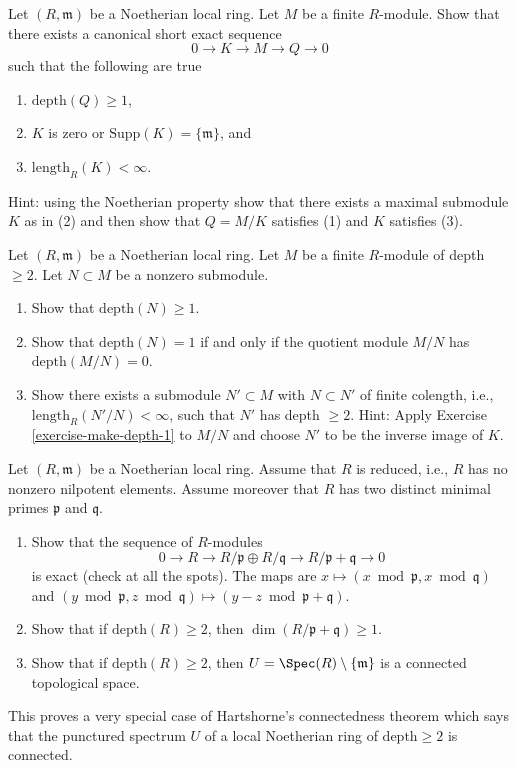 \begin{exercise}
\label{exercise-make-depth-1}
Let $(R, \mathfrak m)$ be a Noetherian local ring.
Let $M$ be a finite $R$-module.
Show that there exists a canonical short exact sequence
$$
0 \to K \to M \to Q \to 0
$$
such that the following are true
\begin{enumerate}
\item $\text{depth}(Q) \geq 1$,
\item $K$ is zero or $\text{Supp}(K) = \{\mathfrak m\}$, and
\item $\text{length}_R(K) < \infty$.
\end{enumerate}
Hint: using the Noetherian property show that
there exists a maximal submodule $K$ as in (2)
and then show that $Q = M/K$ satisfies (1) and $K$ satisfies (3).
\end{exercise}

\begin{exercise}
\label{exercise-make-depth-2}
Let $(R, \mathfrak m)$ be a Noetherian local ring.
Let $M$ be a finite $R$-module of depth $\geq 2$.
Let $N \subset M$ be a nonzero submodule.
\begin{enumerate}
\item Show that $\text{depth}(N) \geq 1$.
\item Show that $\text{depth}(N) = 1$ if and only if the
quotient module $M/N$ has $\text{depth}(M/N) = 0$.
\item Show there exists a submodule $N' \subset M$ with
$N \subset N'$ of finite colength, i.e.,
$\text{length}_R(N'/N) < \infty$, such that $N'$ has
depth $\geq 2$. Hint: Apply Exercise \ref{exercise-make-depth-1} to $M/N$
and choose $N'$ to be the inverse image of $K$.
\end{enumerate}
\end{exercise}

\begin{exercise}
\label{exercise-Hartshorne-reduced}
Let $(R, \mathfrak m)$ be a Noetherian local ring.
Assume that $R$ is reduced, i.e., $R$ has no nonzero
nilpotent elements. Assume moreover that $R$ has two
distinct minimal primes $\mathfrak p$ and $\mathfrak q$.
\begin{enumerate}
\item Show that the sequence of $R$-modules
$$
0 \to R \to R/\mathfrak p \oplus R/\mathfrak q \to
R/\mathfrak p + \mathfrak q \to 0
$$
is exact (check at all the spots). The maps are
$x \mapsto (x \bmod \mathfrak p, x \bmod \mathfrak q)$
and $(y \bmod \mathfrak p, z \bmod \mathfrak q) \mapsto
(y - z \bmod \mathfrak p + \mathfrak q)$.
\item Show that if $\text{depth}(R) \geq 2$, then
$\dim(R/\mathfrak p + \mathfrak q) \geq 1$.
\item Show that if $\text{depth}(R) \geq 2$, then
$U = \Spec(R) \setminus \{\mathfrak m\}$ is a connected
topological space.
\end{enumerate}
This proves a very special case of Hartshorne's connectedness
theorem which says that the punctured spectrum $U$ of a local
Noetherian ring of $\text{depth} \geq 2$ is connected.
\end{exercise}

